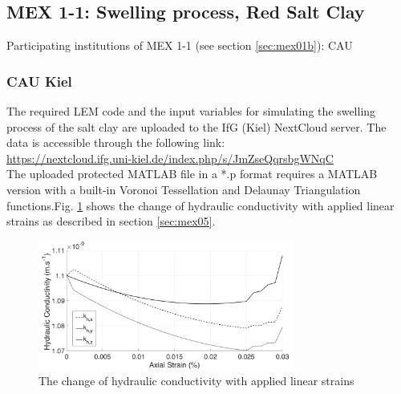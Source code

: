 \subsection{MEX 1-1: Swelling process, Red Salt Clay}

Participating institutions of MEX 1-1 (see section \ref{sec:mex01b}): CAU

\subsubsection*{CAU Kiel}

The required LEM code and the input variables for simulating the swelling process of the salt clay are uploaded to the IfG (Kiel) NextCloud server. The data is accessible through the following link:\\
\hyperlink{https://nextcloud.ifg.uni-kiel.de/index.php/s/JmZseQqrsbgWNqC}{https://nextcloud.ifg.uni-kiel.de/index.php/s/JmZseQqrsbgWNqC}\\

The uploaded protected MATLAB file in a *.p format requires a MATLAB version with a built-in Voronoi Tessellation and Delaunay Triangulation functions.Fig. \ref{fig:Amir_ME5_Lattice_Drying_Data} shows the change of hydraulic conductivity with applied linear strains as described in section \ref {sec:mex05}. 

\begin{figure}[!ht]
\centering
\includegraphics[width=0.75\textwidth]{figures/Amir_ME5_Lattice_Drying_Data.png}
\caption{The change of hydraulic conductivity with applied linear strains}
\label{fig:Amir_ME5_Lattice_Drying_Data}
\end{figure}

